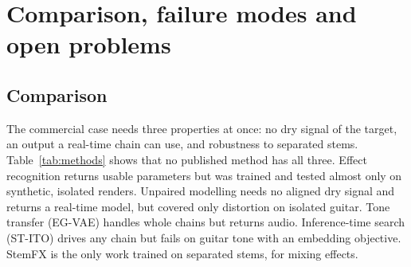\section{Comparison, failure modes and open problems}
\label{sec:comparison}

\subsection{Comparison}

The commercial case needs three properties at once: no dry signal of the target,
an output a real-time chain can use, and robustness to separated stems.
Table~\ref{tab:methods} shows that no published method has all three. Effect
recognition returns usable parameters but was trained and tested almost only on
synthetic, isolated renders. Unpaired modelling needs no aligned dry signal and
returns a real-time model, but covered only distortion on isolated guitar. Tone
transfer (EG-VAE) handles whole chains but returns audio. Inference-time search
(ST-ITO) drives any chain but fails on guitar tone with an embedding objective.
StemFX is the only work trained on separated stems, for mixing effects.

